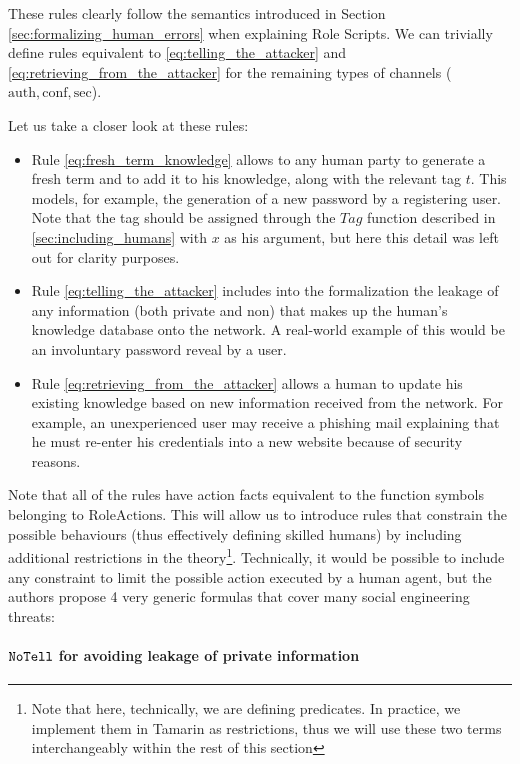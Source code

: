 \documentclass{article}
\newcommand{\mono}[1]{\textrm{\tt #1}}
\begin{document}
These rules clearly follow the semantics introduced in Section \ref{sec:formalizing_human_errors} when explaining Role Scripts. We can trivially define rules equivalent to \ref{eq:telling_the_attacker} and \ref{eq:retrieving_from_the_attacker} for the remaining types of channels ($\textrm{auth}, \textrm{conf}, \textrm{sec}$).

Let us take a closer look at these rules:

\begin{itemize}
    \item Rule \ref{eq:fresh_term_knowledge} allows to any human party to generate a fresh term and to add it to his knowledge, along with the relevant tag $t$. This models, for example, the generation of a new password by a registering user. Note that the tag should be assigned through the $Tag$ function described in \ref{sec:including_humans} with $x$ as his argument, but here this detail was left out for clarity purposes.
    \item Rule \ref{eq:telling_the_attacker} includes into the formalization the leakage of any information (both private and non) that makes up the human's knowledge database onto the network. A real-world example of this would be an involuntary password reveal by a user.
    \item Rule \ref{eq:retrieving_from_the_attacker} allows a human to update his existing knowledge based on new information received from the network. For example, an unexperienced user may receive a phishing mail explaining that he must re-enter his credentials into a new website because of security reasons.
\end{itemize}

Note that all of the rules have action facts equivalent to the function symbols belonging to $\textrm{RoleActions}$. This will allow us to introduce rules that constrain the possible behaviours (thus effectively defining skilled humans) by including additional restrictions in the theory\footnote{Note that here, technically, we are defining predicates. In practice, we implement them in Tamarin as restrictions, thus we will use these two terms interchangeably within the rest of this section}. Technically, it would be possible to include any constraint to limit the possible action executed by a human agent, but the authors propose 4 very generic formulas that cover many social engineering threats:

\paragraph{$\mono{NoTell}$ for avoiding leakage of private information}
\end{document}
